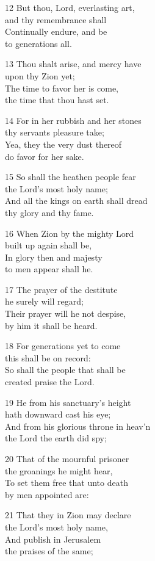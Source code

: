 12 But thou, Lord, everlasting art,\\
and thy remembrance shall\\
Continually endure, and be\\
to generations all.

13 Thou shalt arise, and mercy have\\
upon thy Zion yet;\\
The time to favor her is come,\\
the time that thou hast set.

14 For in her rubbish and her stones\\
thy servants pleasure take;\\
Yea, they the very dust thereof\\
do favor for her sake.

15 So shall the heathen people fear\\
the Lord’s most holy name;\\
And all the kings on earth shall dread\\
thy glory and thy fame.

16 When Zion by the mighty Lord\\
built up again shall be,\\
In glory then and majesty\\
to men appear shall he.

17 The prayer of the destitute\\
he surely will regard;\\
Their prayer will he not despise,\\
by him it shall be heard.

18 For generations yet to come\\
this shall be on record:\\
So shall the people that shall be\\
created praise the Lord.

19 He from his sanctuary’s height\\
hath downward cast his eye;\\
And from his glorious throne in heav’n\\
the Lord the earth did spy;

20 That of the mournful prisoner\\
the groanings he might hear,\\
To set them free that unto death\\
by men appointed are:

21 That they in Zion may declare\\
the Lord’s most holy name,\\
And publish in Jerusalem\\
the praises of the same;

